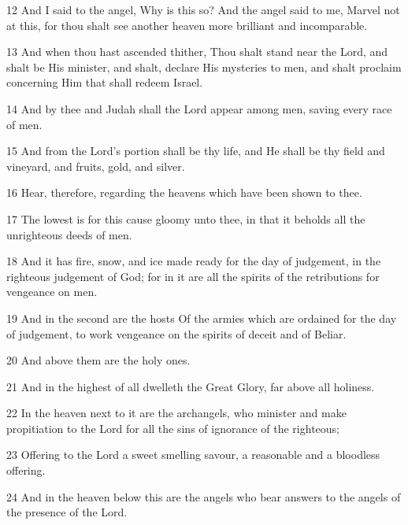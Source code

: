 \par 12 And I said to the angel, Why is this so? And the angel said to me, Marvel not at this, for thou shalt see another heaven more brilliant and incomparable.

\par 13 And when thou hast ascended thither, Thou shalt stand near the Lord, and shalt be His minister, and shalt, declare His mysteries to men, and shalt proclaim concerning Him that shall redeem Israel.

\par 14 And by thee and Judah shall the Lord appear among men, saving every race of men.

\par 15 And from the Lord's portion shall be thy life, and He shall be thy field and vineyard, and fruits, gold, and silver.

\par 16 Hear, therefore, regarding the heavens which have been shown to thee.

\par 17 The lowest is for this cause gloomy unto thee, in that it beholds all the unrighteous deeds of men.

\par 18 And it has fire, snow, and ice made ready for the day of judgement, in the righteous judgement of God; for in it are all the spirits of the retributions for vengeance on men.

\par 19 And in the second are the hosts Of the armies which are ordained for the day of judgement, to work vengeance on the spirits of deceit and of Beliar.

\par 20 And above them are the holy ones.

\par 21 And in the highest of all dwelleth the Great Glory, far above all holiness.

\par 22 In the heaven next to it are the archangels, who minister and make propitiation to the Lord for all the sins of ignorance of the righteous;

\par 23 Offering to the Lord a sweet smelling savour, a reasonable and a bloodless offering.

\par 24 And in the heaven below this are the angels who bear answers to the angels of the presence of the Lord.

